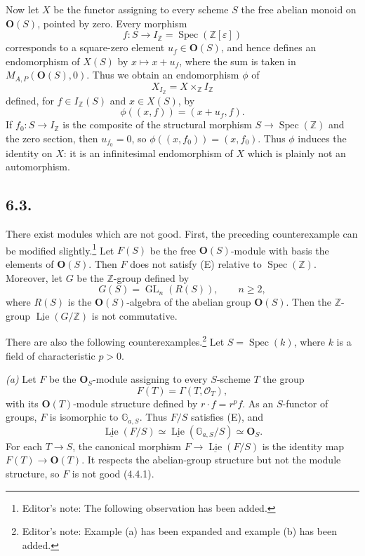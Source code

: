 Now let \(X\) be the functor assigning to every scheme \(S\) the free
abelian monoid on \(\mathbf O(S)\), pointed by zero. Every morphism
\[
 f:S\longrightarrow I_{\mathbb Z}
   =\operatorname{Spec}(\mathbb Z[\varepsilon])
\]
corresponds to a square-zero element \(u_f\in\mathbf O(S)\), and hence
defines an endomorphism of \(X(S)\) by
\(x\mapsto x+u_f\), where the sum is taken in
\(M_{A,P}(\mathbf O(S),0)\). Thus we obtain an endomorphism
\(\phi\) of
\[
 X_{I_{\mathbb Z}}=X\times_{\mathbb Z}I_{\mathbb Z}
\]
defined, for \(f\in I_{\mathbb Z}(S)\) and \(x\in X(S)\), by
\[
 \phi((x,f))=(x+u_f,f).
\]
If \(f_0:S\to I_{\mathbb Z}\) is the composite of the structural
morphism \(S\to\operatorname{Spec}(\mathbb Z)\) and the zero section,
then \(u_{f_0}=0\), so
\(\phi((x,f_0))=(x,f_0)\). Thus \(\phi\) induces the identity on
\(X\): it is an infinitesimal endomorphism of \(X\) which is plainly
not an automorphism.

\subsection*{6.3.}
There exist modules which are not good. First, the preceding
counterexample can be modified slightly.\footnote{Editor's note: The
following observation has been added.} Let \(F(S)\) be the free
\(\mathbf O(S)\)-module with basis the elements of \(\mathbf O(S)\).
Then \(F\) does not satisfy (E) relative to
\(\operatorname{Spec}(\mathbb Z)\). Moreover, let \(G\) be the
\(\mathbb Z\)-group defined by
\[
 G(S)=\operatorname{GL}_n(R(S)),\qquad n\geq2,
\]
where \(R(S)\) is the \(\mathbf O(S)\)-algebra of the abelian group
\(\mathbf O(S)\). Then the \(\mathbb Z\)-group
\(\underline{\operatorname{Lie}}(G/\mathbb Z)\) is not commutative.

There are also the following counterexamples.\footnote{Editor's note:
Example (a) has been expanded and example (b) has been added.} Let
\(S=\operatorname{Spec}(k)\), where \(k\) is a field of characteristic
\(p>0\).

\medskip
\noindent\textit{(a)}
Let \(F\) be the \(\mathbf O_S\)-module assigning to every \(S\)-scheme
\(T\) the group
\[
 F(T)=\Gamma(T,\mathscr O_T),
\]
with its \(\mathbf O(T)\)-module structure defined by
\(r\cdot f=r^pf\). As an \(S\)-functor of groups, \(F\) is isomorphic
to \(\mathbb G_{a,S}\). Thus \(F/S\) satisfies (E), and
\[
 \underline{\operatorname{Lie}}(F/S)
 \simeq
 \underline{\operatorname{Lie}}(\mathbb G_{a,S}/S)
 \simeq\mathbf O_S.
\]
For each \(T\to S\), the canonical morphism
\(F\to\underline{\operatorname{Lie}}(F/S)\) is the identity map
\(F(T)\to\mathbf O(T)\). It respects the abelian-group structure but
not the module structure, so \(F\) is not good (4.4.1).

